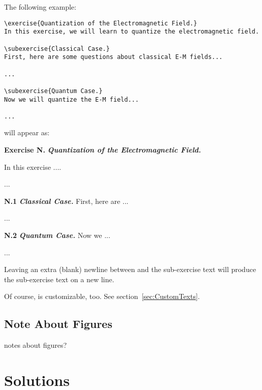 \documentclass[11pt,a4paper]{article}
\begin{document}
The following example:
\begin{pkgverbatim}
\begin{verbatim}
\exercise{Quantization of the Electromagnetic Field.}
In this exercise, we will learn to quantize the electromagnetic field.

\subexercise{Classical Case.}
First, here are some questions about classical E-M fields...

...

\subexercise{Quantum Case.}
Now we will quantize the E-M field...

...

\end{verbatim}
\end{pkgverbatim}
will appear as:
\begin{pkgverbatim}[0mm]
  {\bf Exercise N.} \hspace*{2mm} {\em\bfseries Quantization of the Electromagnetic Field.}

  In this exercise ....

  ...

  {\bf N.1}\hspace*{1mm} {\em\bfseries Classical Case.}\hspace*{3mm} First, here are ...

  ...

  {\bf N.2}\hspace*{1mm} {\em\bfseries Quantum Case.}\hspace*{3mm} Now we ...

  ...
  
\end{pkgverbatim}

\begin{pkgtip}
  Leaving an extra (blank) newline between  and the sub-exercise text
  will produce the sub-exercise text on a new line.
\end{pkgtip}

\begin{pkgtip}
  Of course,  is customizable, too. See section~\ref{sec:CustomTexts}.
\end{pkgtip}

\subsection{Note About Figures}

notes about figures?



\section{Solutions}
\label{sec:Solutions}
\end{document}
